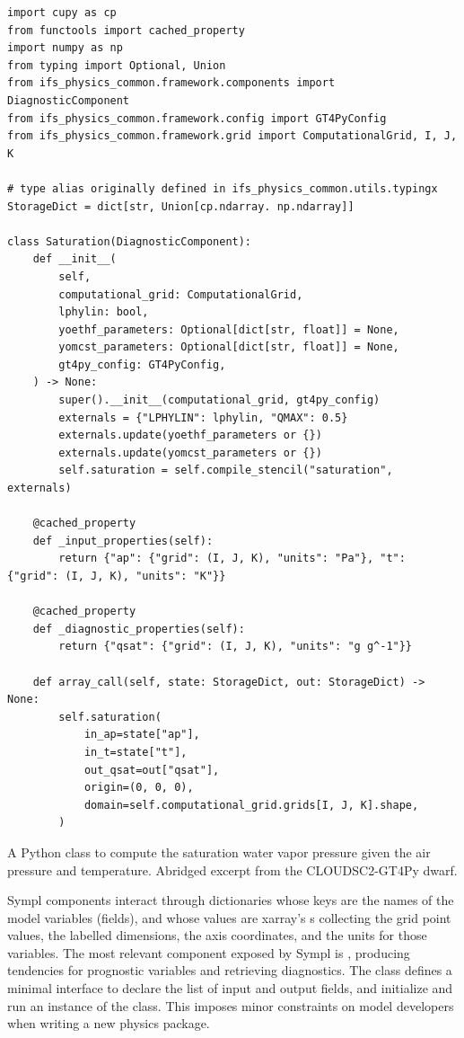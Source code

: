 \documentclass[gmd,manuscript,online]{copernicus}
\theoremstyle{theorem}
\theoremstyle{definition}
\theoremstyle{remark}
\theoremstyle{proposition}
\begin{document}
	\begin{listing}[t!]
		\begin{verbatim}
import cupy as cp
from functools import cached_property
import numpy as np
from typing import Optional, Union
from ifs_physics_common.framework.components import DiagnosticComponent
from ifs_physics_common.framework.config import GT4PyConfig
from ifs_physics_common.framework.grid import ComputationalGrid, I, J, K

# type alias originally defined in ifs_physics_common.utils.typingx
StorageDict = dict[str, Union[cp.ndarray. np.ndarray]]

class Saturation(DiagnosticComponent):
    def __init__(
        self,
        computational_grid: ComputationalGrid,
        lphylin: bool,
        yoethf_parameters: Optional[dict[str, float]] = None,
        yomcst_parameters: Optional[dict[str, float]] = None,
        gt4py_config: GT4PyConfig,
    ) -> None:
        super().__init__(computational_grid, gt4py_config)
        externals = {"LPHYLIN": lphylin, "QMAX": 0.5}
        externals.update(yoethf_parameters or {})
        externals.update(yomcst_parameters or {})
        self.saturation = self.compile_stencil("saturation", externals)

    @cached_property
    def _input_properties(self):
        return {"ap": {"grid": (I, J, K), "units": "Pa"}, "t": {"grid": (I, J, K), "units": "K"}}

    @cached_property
    def _diagnostic_properties(self):
        return {"qsat": {"grid": (I, J, K), "units": "g g^-1"}}

    def array_call(self, state: StorageDict, out: StorageDict) -> None:
        self.saturation(
            in_ap=state["ap"],
            in_t=state["t"],
            out_qsat=out["qsat"],
            origin=(0, 0, 0),
            domain=self.computational_grid.grids[I, J, K].shape,
        )
		\end{verbatim}

		\caption{A Python class to compute the saturation water vapor pressure given the air pressure and temperature. Abridged excerpt from the CLOUDSC2-GT4Py dwarf.}
		\label{lst:saturation-infrastructure}
	\end{listing}

	Sympl components interact through dictionaries whose keys are the names of the model variables (fields), and whose values are xarray's s \citep{hoyer17} collecting the grid point values, the labelled dimensions, the axis coordinates, and the units for those variables. The most relevant component exposed by Sympl is , producing tendencies for prognostic variables and retrieving diagnostics. The class defines a minimal interface to declare the list of input and output fields, and initialize and run an instance of the class. This imposes minor constraints on model developers when writing a new physics package.
\end{document}
